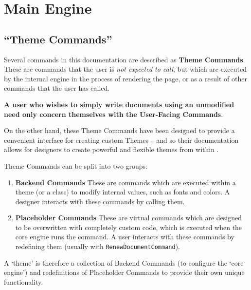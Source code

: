 


\chapter{Main Engine}

	\section{``Theme Commands''}\label{S:ThemeCommands}

		Several commands in this documentation are described as \textbf{Theme Commands}. These are commands that the user is \textit{not expected to call}, but which are executed by the internal engine in the process of rendering the page, or as a result of other commands that the user has called. 

		\begin{center}
		\large \textbf{A user who wishes to simply write documents using an unmodified \rpgtex{} need only concern themselves with the User-Facing Commands}. 
		\end{center}
		On the other hand, these Theme Commands have been designed to provide a convenient interface for creating custom Themes -- and so their documentation allows for designers to create powerful and flexible themes from within \rpgtex{}. 
		
		Theme Commands can be split into two groups:
		
		\begin{enumerate}
			\item \textbf{Backend Commands} These are commands which are executed within a theme (or a class) to modify internal values, such as fonts and colors. A designer interacts with these commands by calling them.
			\item \textbf{Placeholder Commands} These are virtual commands which are designed to be overwritten with completely custom code, which is executed when the core engine runs the command. A user interacts with these commands by redefining them  (usually with \verb|RenewDocumentCommand|).
		\end{enumerate}

		A `theme' is therefore a collection of Backend Commands (to configure the `core engine') and redefinitions of Placeholder Commands to provide their own unique functionality.
		\def\backendCommand{\hyperref[S:ThemeCommands]{\textcolor{blue!40!black}{{Backend Command}}}}
		\def\placeholderCommand{\hyperref[S:ThemeCommands]{\textcolor{blue!40!black}{{Placeholder Command}}}}
		
